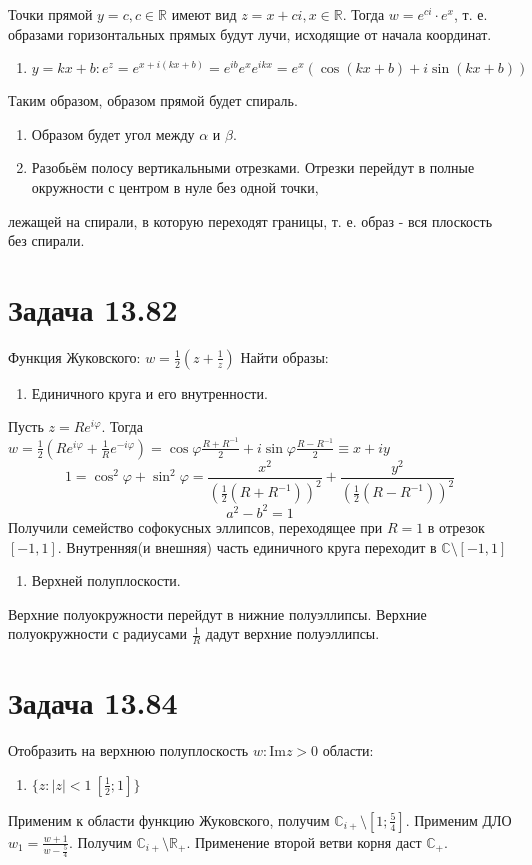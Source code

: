 \documentclass[11pt]{article}
\begin{document}
Точки прямой \(y = c, c \in \mathbb{R}\) имеют вид \(z = x + ci, x \in \mathbb{R}\). Тогда \(w = e^{ci}\cdot e^x\), т. е.
образами горизонтальных прямых будут лучи, исходящие от начала координат.
\begin{enumerate}
\item \(y = kx + b: e^z = e^{x + i(kx + b)} = e^{ib}e^xe^{ikx} = e^x(\cos(kx + b) + i\sin(kx + b))\)
\end{enumerate}

Таким образом, образом прямой будет спираль.
\begin{enumerate}
\item Образом будет угол между \(\alpha\) и \(\beta\).
\item Разобьём полосу вертикальными отрезками. Отрезки перейдут в полные окружности с центром в нуле без одной точки,
\end{enumerate}
лежащей на спирали, в которую переходят границы, т. е. образ - вся плоскость без спирали.
\section{Задача 13.82}
\label{sec:org596f847}
Функция Жуковского: \(w = \frac{1}2\left(z + \frac{1}{z}\right)\)
Найти образы:
\begin{enumerate}
\item Единичного круга и его внутренности.
\end{enumerate}
Пусть \(z = Re^{i\varphi}\). Тогда \(w = \frac{1}2\left(Re^{i\varphi} + \frac{1}Re^{-i\varphi}\right)
= \cos\varphi\frac{R + R^{-1}}2 + i\sin\varphi\frac{R - R^{-1}}2 \equiv x + iy\)
$$1 = \cos^2\varphi + \sin^2\varphi = \frac{x^2}{(\frac{1}2(R+R^{-1}))^2} + \frac{y^2}{(\frac{1}2(R - R^{-1}))^2}$$
$$a^2 - b^2 = 1$$
Получили семейство софокусных эллипсов, переходящее при \(R = 1\) в отрезок \([-1, 1]\).
Внутренняя(и внешняя) часть единичного круга переходит в \(\mathbb{C} \setminus [-1, 1]\)
\begin{enumerate}
\item Верхней полуплоскости.
\end{enumerate}
Верхние полуокружности перейдут в нижние полуэллипсы. Верхние полуокружности с радиусами \(\frac{1}{R}\) дадут верхние
полуэллипсы.
\section{Задача 13.84}
\label{sec:org3acb421}
Отобразить на верхнюю полуплоскость \({w: \mathrm{Im} z > 0}\) области:
\begin{enumerate}
\item \(\{z: |z| < 1 \ \left[\frac{1}2; 1\right]\}\)
\end{enumerate}
Применим к области функцию Жуковского, получим \(\mathbb{C}_{i+} \setminus \left[1; \frac{5}4\right]\).
Применим ДЛО \(w_1 = \frac{w + 1}{w - \frac{5}4}\). Получим \(\mathbb{C}_{i+} \setminus \mathbb{R}_+\).
Применение второй ветви корня даст \(\mathbb{C}_+\).
\end{document}
